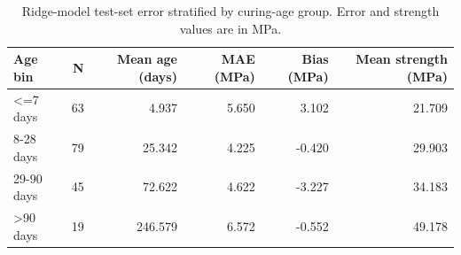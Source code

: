 \begin{table}
\caption{Ridge-model test-set error stratified by curing-age group. Error and strength values are in MPa.}
\label{tab:error-by-age}
\begin{tabular}{lrrrrr}
\toprule
Age bin & N & Mean age (days) & MAE (MPa) & Bias (MPa) & Mean strength (MPa) \\
\midrule
<=7 days & 63 & 4.937 & 5.650 & 3.102 & 21.709 \\
8-28 days & 79 & 25.342 & 4.225 & -0.420 & 29.903 \\
29-90 days & 45 & 72.622 & 4.622 & -3.227 & 34.183 \\
>90 days & 19 & 246.579 & 6.572 & -0.552 & 49.178 \\
\bottomrule
\end{tabular}
\end{table}
